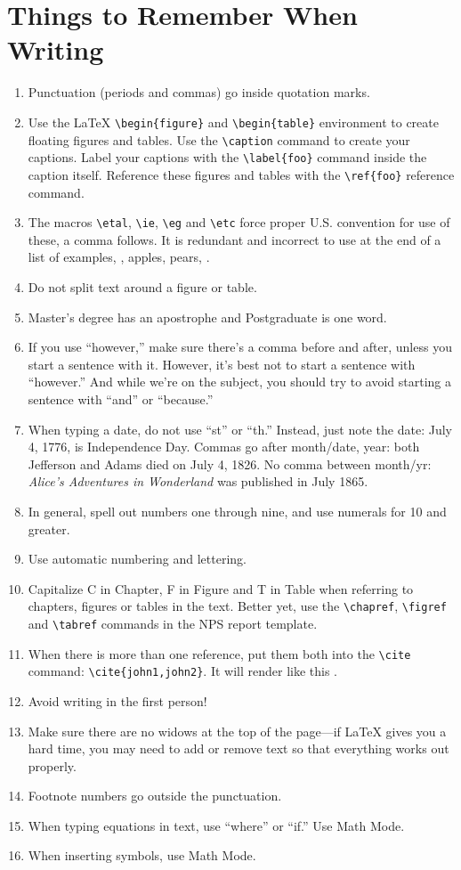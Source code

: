 \section{Things to Remember When Writing}\label{sec:remember}
\begin{enumerate}
\item Punctuation (periods and commas) go inside quotation marks. 
\item Use the \LaTeX{} \verb+\begin{figure}+ and \verb+\begin{table}+ environment to
  create floating figures and tables. Use the \verb+\caption+ command
  to create your captions. Label your captions with the
  \verb+\label{foo}+ command inside the caption itself. Reference
  these figures and tables with the \verb+\ref{foo}+ reference command.
\item The macros \verb+\etal+, \verb+\ie+, \verb+\eg+ and \verb+\etc+ force proper
  U.S. convention for use of these, \ie a comma follows.
  It is redundant and incorrect to use \etc at the end of a list of
  examples, \eg, apples, pears, \etc.
\item Do not split text around a figure or table. 
\item Master's degree has an apostrophe and Postgraduate is one word. 
\item If you use ``however,'' make sure there's a comma before and after,
unless you 
start a sentence with it. However, it's best not to start a sentence
with ``however.'' And while we're on the subject, you should try to avoid starting a sentence with ``and'' or ``because.'' 
\item When typing a date, do not use ``st'' or ``th.'' Instead, just
  note the date: July 4, 1776, is Independence Day. Commas go 
after month/date, year: both Jefferson and Adams died on July 4, 1826.
No comma between month/yr: \textit{Alice's Adventures in Wonderland} was published in July 1865.
\item In general, spell out numbers one through nine, and use numerals for 10 and greater.
\item Use automatic numbering and lettering.
\item Capitalize C in Chapter, F in Figure and T in Table when referring
to chapters, figures or tables in the text. Better yet, use the \verb+\chapref+,
\verb+\figref+ and \verb+\tabref+ commands in the NPS report template.
\item When there is more than one reference, put them both into the \verb+\cite+ command: \verb+\cite{john1,john2}+. It will render like this \cite{IEEEhowto:IEEEtranpage,IEEEexample:shellCTANpage}.
\item Avoid writing in the first person!
\item Make sure there are no widows at the
  top of the page---if \LaTeX{} gives you a hard time, you may need to
  add or remove text so that everything works out properly.
\item Footnote numbers go outside the punctuation. 
\item When typing equations in text, use ``where'' or ``if.'' Use
  Math Mode. 
\item When inserting symbols, use Math Mode.
\end{enumerate}